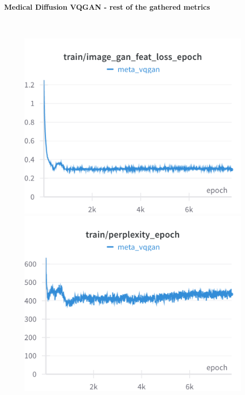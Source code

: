 \paragraph{Medical Diffusion VQGAN - rest of the gathered metrics}\mbox{}\\

\begin{figure}[H]
\includegraphics[width=\linewidth]{detailed_engineering/Meta VQGAN/charts/Section-2-Panel-0-63j0lica5}
\caption{}
\endminipage\hfill
{}
\includegraphics[width=\linewidth]{detailed_engineering/Meta VQGAN/charts/Section-2-Panel-1-5nrgzgmoj}
\caption{}
\endminipage
\end{figure}

